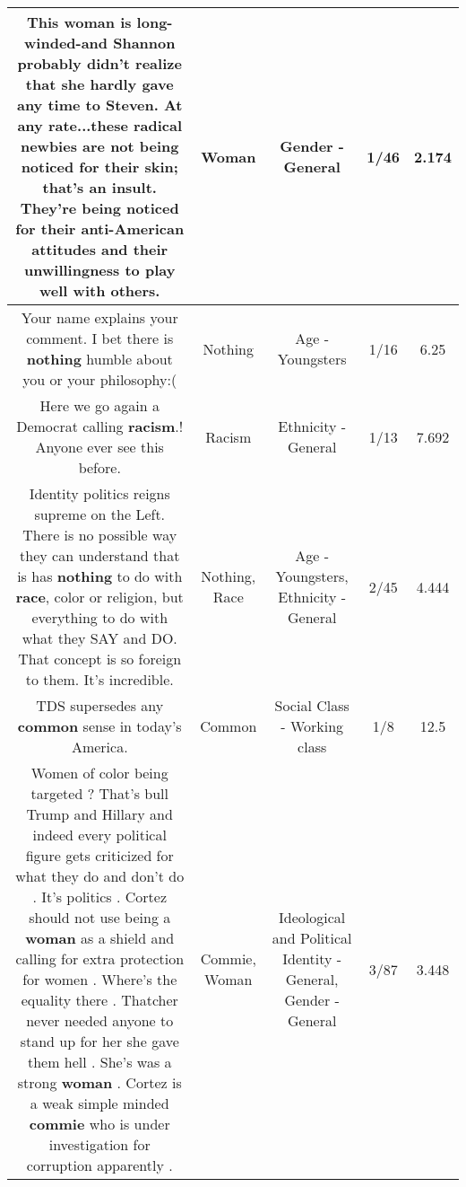 \documentclass[11pt]{article}
\newlength\mylength
\begin{document}
\begin{center}
\begin{longtable}{|C{.65\mylength}|C{.30\mylength}|C{.12\mylength}|C{.12\mylength}|C{.12\mylength}|}
  \small This \textbf{woman} is long-winded-and Shannon probably didn't realize that she hardly gave any time to Steven. At any rate...these radical newbies are not being noticed for their skin; that's an insult. They're being noticed for their anti-American attitudes and their unwillingness to play well with others.\normalsize   & Woman & Gender - General & 1/46 & 2.174 \\  \hline
  \small Your name explains your comment. I bet there is \textbf{nothing} humble about you or your philosophy:(\normalsize   & Nothing & Age - Youngsters & 1/16 & 6.25 \\  \hline
  \small Here we go again a Democrat calling \textbf{racism}.! Anyone ever see this before.\normalsize   & Racism & Ethnicity - General & 1/13 & 7.692 \\  \hline
  \small Identity politics reigns supreme on the Left. There is no possible way they can understand that is has \textbf{nothing} to do with \textbf{race}, color or religion, but everything to do with what they SAY and DO. That concept is so foreign to them. It's incredible.\normalsize   & Nothing, Race & Age - Youngsters, Ethnicity - General & 2/45 & 4.444 \\  \hline
  \small TDS supersedes any \textbf{common} sense in today's America.\normalsize   & Common & Social Class - Working class & 1/8 & 12.5 \\  \hline
  \small Women of color being targeted ? That's bull Trump and Hillary and indeed every political figure gets criticized for what they do and don't do . It's politics . Cortez should not use being a \textbf{woman} as a shield and calling for extra protection for women . Where's the equality there .  Thatcher never needed anyone to stand up for her she gave them hell . She's was a strong \textbf{woman} . Cortez is a weak simple minded \textbf{commie} who is under investigation for corruption apparently .\normalsize   & Commie, Woman &  Ideological and Political Identity - General, Gender - General & 3/87 & 3.448 \\  \hline

\end{longtable}
\end{center}
\end{document}
